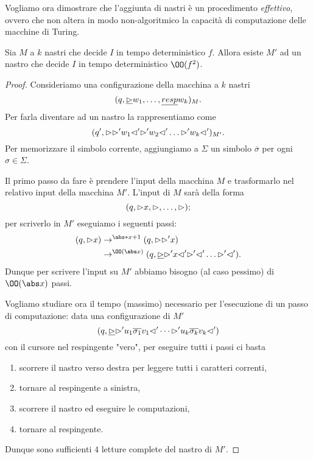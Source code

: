 Vogliamo ora dimostrare che l'aggiunta di nastri è un procedimento \emph{effettivo},
ovvero che non altera in modo non-algoritmico la capacità di computazione delle macchine di Turing.

\begin{theorem}
    Sia $M$ a $k$ nastri che decide $I$ in tempo deterministico $f$. 
    Allora esiste $M'$ ad un nastro che decide $I$ in tempo deterministico $\OO(f^2)$. 
\end{theorem}
\begin{proof}
    Consideriamo una configurazione della macchina a $k$ nastri \[
        (q, \underline{{\vartriangleright}}w_1, \dots, \underline{resp}w_k)_M.
    \] Per farla diventare ad un nastro la rappresentiamo come \[
        (q', {\vartriangleright}{\vartriangleright}'w_1{\vartriangleleft}'{\vartriangleright}'w_2{\vartriangleleft}'\dots{\vartriangleright}'w_k{\vartriangleleft}')_{M'}.
    \] Per memorizzare il simbolo corrente, aggiungiamo a $\Sigma$ un simbolo $\overline{\sigma}$
    per ogni $\sigma \in \Sigma$.
    
    Il primo passo da fare è prendere l'input della macchina $M$ 
    e trasformarlo nel relativo input della macchina $M'$. L'input di $M$ sarà della forma \[
        (q, {\vartriangleright} x, {\vartriangleright}, \dots, {\vartriangleright});
    \] per scriverlo in $M'$ eseguiamo i seguenti passi: 
    \begin{align*}
        (q, \resp x) 
        &\to^{\abs*{x} + 1} (q, \resp\resp' x) \\
        &\to^{\OO(\abs x)} (q, \ul{\resp}\resp'x\eresp'\resp'\eresp'\dots\resp'\eresp').
    \end{align*} Dunque per scrivere l'input su $M'$ abbiamo bisogno (al caso pessimo) 
    di $\OO(\abs x)$ passi.
    
    Vogliamo studiare ora il tempo (massimo) necessario per l'esecuzione di un passo di computazione: 
    data una configurazione di $M'$ \[
        (q, \underline{{\vartriangleright}} 
            {\vartriangleright}' u_1\overline{\sigma_1}v_1 {\vartriangleleft}' \cdots 
            {\vartriangleright}' u_k\overline{\sigma_k}v_k {\vartriangleleft}')
    \] con il cursore nel respingente "vero", per eseguire tutti i passi ci basta 
    \begin{enumerate}[(1)]
        \item scorrere il nastro verso destra per leggere tutti i caratteri correnti,
        \item tornare al respingente a sinistra,
        \item scorrere il nastro ed eseguire le computazioni,
        \item tornare al respingente.
    \end{enumerate} Dunque sono sufficienti $4$ letture complete del nastro di $M'$.
    

\end{proof}
